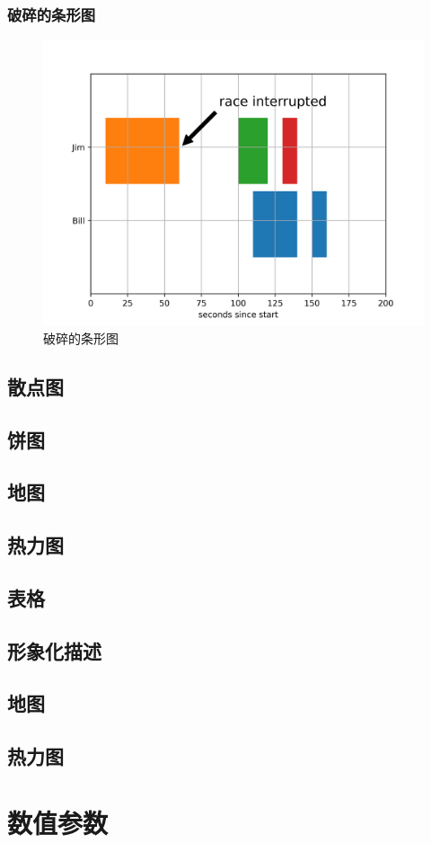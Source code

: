 \documentclass[openany]{progbookcn}
\begin{document}
\subsection{破碎的条形图}

\begin{figure}[H]
\centering
\includegraphics[width=0.6 \textwidth]{figs/chapter9/bars/BrokenBar}
\caption{破碎的条形图}
\end{figure}

\section{散点图}
\section{饼图}
\section{地图}
\section{热力图}
\section{表格}
\section{形象化描述}
\section{地图}
\section{热力图}
\chapter{数值参数}
\end{document}
